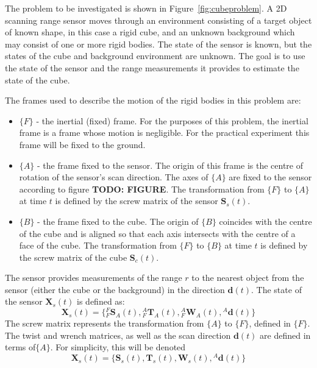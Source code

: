 The problem to be investigated is shown in Figure~\ref{fig:cubeproblem}. A 2D scanning range sensor moves through an environment consisting of a target object of known shape, in this case a rigid cube, and an unknown background which may consist of one or more rigid bodies. The state of the sensor is known, but the states of the cube and background environment are unknown. The goal is to use the state of the sensor and the range measurements it provides to estimate the state of the cube.

The frames used to describe the motion of the rigid bodies in this problem are:
\begin{itemize}
\item $\{F\}$ - the inertial (fixed) frame. For the purposes of this problem, the inertial frame is a frame whose motion is negligible. For the practical experiment this frame will be fixed to the ground.
\item $\{A\}$ - the frame fixed to the sensor. The origin of this frame is the centre of rotation of the sensor's scan direction. The axes of $\{A\}$ are fixed to the sensor according to figure \textbf{TODO: FIGURE}. The transformation from $\{F\}$ to $\{A\}$ at time $t$ is defined by the screw matrix of the sensor $\mathbf{S}_{s}(t)$.
\item $\{B\}$ - the frame fixed to the cube. The origin of $\{B\}$ coincides with the centre of the cube and is aligned so that each axis intersects with the centre of a face of the cube. The transformation from $\{F\}$ to $\{B\}$ at time $t$ is defined by the screw matrix of the cube $\mathbf{S}_{c}(t)$.
\end{itemize} 

The sensor provides measurements of the range $r$ to the nearest object from the sensor (either the cube or the background) in the direction $\mathbf{d}(t)$. 
The state of the sensor $\mathbf{X}_{s}(t)$ is defined as:
\begin{equation}
	\mathbf{X}_{s}(t) = 
	\{{^{F}_{F}\mathbf{S}^{}_{A}(t)},{^{A}_{F}\mathbf{T}^{}_{A}(t)},{^{A}_{F}\mathbf{W}^{}_{A}(t)},
	{^{A}\mathbf{d}(t)}\}
\end{equation}
The screw matrix represents the transformation from $\{A\}$ to $\{F\}$, defined in $\{F\}$. The twist and wrench matrices, as well as the scan direction $\mathbf{d}(t)$ are defined in terms of$\{A\}$.
For simplicity, this will be denoted 
\begin{equation}
	\mathbf{X}_{s}(t) = 
	\{\mathbf{S}_{s}(t),\mathbf{T}_{s}(t),\mathbf{W}_{s}(t),{^{A}\mathbf{d}(t)}\}
\end{equation}

